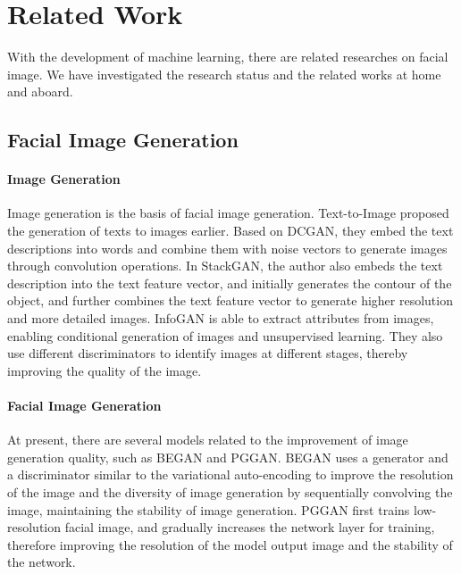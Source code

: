 \section{Related Work}


With the development of machine learning, there are related researches on facial image.
We have investigated the research status and the related works at home and aboard.

\subsection{Facial Image Generation}

\paragraph{Image Generation}

Image generation is the basis of facial image generation.
Text-to-Image proposed the generation of texts to images earlier.
Based on DCGAN, they embed the text descriptions into words and combine them with noise vectors to generate images through convolution operations.
In StackGAN, the author also embeds the text description into the text feature vector,
    and initially generates the contour of the object,
    and further combines the text feature vector to generate higher resolution and more detailed images.
    InfoGAN is able to extract attributes from images, enabling conditional generation of images and unsupervised learning.
They also use different discriminators to identify images at different stages, thereby improving the quality of the image.


\paragraph{Facial Image Generation}

At present, there are several models related to the improvement of image generation quality,
    such as BEGAN and PGGAN.
BEGAN uses a generator and a discriminator similar to the variational auto-encoding to improve the resolution of the image and the diversity of image generation by sequentially convolving the image,
    maintaining the stability of image generation.
PGGAN first trains low-resolution facial image,
    and gradually increases the network layer for training,
    therefore improving the resolution of the model output image and the stability of the network.



